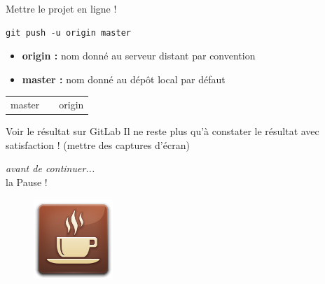 \documentclass{beamer}
\begin{document}
\begin{frame}[fragile]{Mettre le projet en ligne !}
	\begin{lstlisting}[frame=single]
		git push -u origin master
	\end{lstlisting}
	
	\begin{itemize}
		\item \textbf{origin :} nom donné au serveur distant par convention
		\item \textbf{master :} nom donné au dépôt local par défaut
	\end{itemize}
	
	\begin{figure}
  		\centering
	\end{figure}
	\begin{center}
		\begin{tabular}{p{3.5cm}  p{1cm} p{2cm}}
		\centering master & & origin
		\end{tabular}
	\end{center}
\end{frame}

\begin{frame}{Voir le résultat sur GitLab}
	Il ne reste plus qu'à constater le résultat avec satisfaction !
	(mettre des captures d'écran)
\end{frame}


\begin{frame}
	\begin{center}
		{\small  \textit{avant de continuer...}}\\
 		\Large{la Pause !} 		
	\end{center}

	\begin{figure}
		\centering
		\includegraphics[height=3cm]{img/cafe}
	\end{figure}
\end{frame}
\end{document}
